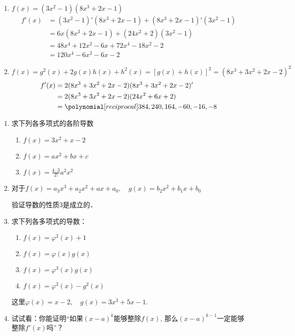     \begin{solution}
\begin{enumerate}
    \item $f(x)=(3x^2-1)(8x^3+2x-1)$
\[\begin{split}
    f' (x) &= (3x^2-1)' (8x^3+2x-1)+(8x^3+2x-1)' (3x^2-1) \\
    &=6x (8x^3+2x-1) + (24x^2+2) (3x^2-1)\\
    &=48x^4+12x^2-6x+72x^4-18x^2-2\\
    &=120x^4-6x^2-6x-2
\end{split}\]
    \item $f(x)=g^2 (x) +2g (x) h (x) +h^2 (x) =[g(x)+h(x)]^2=(8x^3+3x^2+2x-2)^2$
\[\begin{split}
    f'(x)&=2(8x^3+3x^2+2x-2)(8x^3+3x^2+2x-2)'\\
    &=2(8x^3+3x^2+2x-2)(24x^2+6x+2)\\
    &=\poly{384,240,164,-60,-16,-8}
\end{split}\]
\end{enumerate}
 \end{solution}
           
\begin{ex}
\begin{enumerate}
    \item 求下列各多项式的各阶导数
\begin{multicols}{2}
\begin{enumerate}
    \item $f (x) =3x^2+x-2$
    \item $f(x) =ax^2+bx+c$
    \item $f(x)=\frac{4\cdot 3}{2!}a^2x^2$
\end{enumerate}
\end{multicols}

    \item 对于$f(x)=a_3x^3+a_2x^2+ax+a_0,\quad g(x)=b_2x^2+b_1x+b_0$
    
    验证导数的性质3是成立的．

    \item 求下列各多项式的导数：
\begin{multicols}{2}
\begin{enumerate}
    \item $f (x) =\varphi^2 (x) +1$
    \item $f(x)=\varphi(x)g(x)$
    \item $f (x) =\varphi^3 (x) g (x)$
    \item $f(x)=\varphi^2(x)-g^2(x)$
\end{enumerate}
\end{multicols}
这里$\varphi(x)=x-2,\quad g(x)=3x^3+5x-1$.
    \item 试试看：你能证明“如果$(x-a)^k$能够整除$f(x)$, 那么$(x-a)^{k-1}$一定能够整除$f'(x)$吗”？
\end{enumerate}
\end{ex}
 
